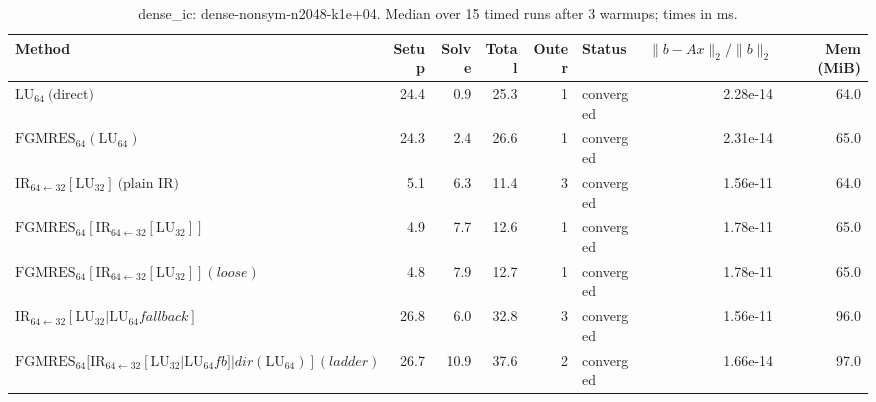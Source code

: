\begin{table}[t]
\centering
\small
\caption{dense_ic: dense-nonsym-n2048-k1e+04. Median over 15 timed runs after 3 warmups; times in ms.}
\label{tab:dense_ic-dense-nonsym-n2048-k1e+04}
\begin{tabular}{lrrrrlrr}
\hline
Method & Setup & Solve & Total & Outer & Status & $\|b-Ax\|_2/\|b\|_2$ & Mem (MiB) \\
\hline
$\mathrm{LU}_{64}\ \text{(direct)}$ & 24.4 & 0.9 & 25.3 & 1 & converged & 2.28e-14 & 64.0 \\
$\mathrm{FGMRES}_{64}(\mathrm{LU}_{64})$ & 24.3 & 2.4 & 26.6 & 1 & converged & 2.31e-14 & 65.0 \\
$\mathrm{IR}_{64\leftarrow 32}[\mathrm{LU}_{32}]\ \text{(plain IR)}$ & 5.1 & 6.3 & 11.4 & 3 & converged & 1.56e-11 & 64.0 \\
$\mathrm{FGMRES}_{64}[\mathrm{IR}_{64\leftarrow 32}[\mathrm{LU}_{32}]]$ & 4.9 & 7.7 & 12.6 & 1 & converged & 1.78e-11 & 65.0 \\
$\mathrm{FGMRES}_{64}[\mathrm{IR}_{64\leftarrow 32}[\mathrm{LU}_{32}]] (loose)$ & 4.8 & 7.9 & 12.7 & 1 & converged & 1.78e-11 & 65.0 \\
$\mathrm{IR}_{64\leftarrow 32}[\mathrm{LU}_{32} | \mathrm{LU}_{64} fallback]$ & 26.8 & 6.0 & 32.8 & 3 & converged & 1.56e-11 & 96.0 \\
$\mathrm{FGMRES}_{64}[\mathrm{IR}_{64\leftarrow 32}[\mathrm{LU}_{32}|\mathrm{LU}_{64} fb]|dir(\mathrm{LU}_{64})] (ladder)$ & 26.7 & 10.9 & 37.6 & 2 & converged & 1.66e-14 & 97.0 \\
\hline
\end{tabular}
\end{table}
